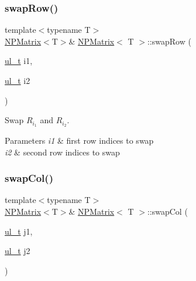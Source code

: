 \subsubsection{\texorpdfstring{swapRow()}{swapRow()}}
{\footnotesize\ttfamily template$<$typename T$>$ \\
\mbox{\hyperlink{class_n_p_matrix}{N\+P\+Matrix}}$<$T$>$\& \mbox{\hyperlink{class_n_p_matrix}{N\+P\+Matrix}}$<$ T $>$\+::swap\+Row (\begin{DoxyParamCaption}\item[{\mbox{\hyperlink{group___n_algebra_ga1b140a2034db3f5dfe18a987745df43a}{ul\+\_\+t}}}]{i1,  }\item[{\mbox{\hyperlink{group___n_algebra_ga1b140a2034db3f5dfe18a987745df43a}{ul\+\_\+t}}}]{i2 }\end{DoxyParamCaption})\hspace{0.3cm}{\ttfamily [inline]}}



Swap $ R_{i_1} $ and $ R_{i_2} $. 


\begin{DoxyParams}{Parameters}
{\em i1} & first row indices to swap \\
\hline
{\em i2} & second row indices to swap \\
\hline
\end{DoxyParams}
\mbox{\label{class_n_p_matrix_a0df10f5717511bc15429955244b83ea1}} 
\subsubsection{\texorpdfstring{swapCol()}{swapCol()}}
{\footnotesize\ttfamily template$<$typename T$>$ \\
\mbox{\hyperlink{class_n_p_matrix}{N\+P\+Matrix}}$<$T$>$\& \mbox{\hyperlink{class_n_p_matrix}{N\+P\+Matrix}}$<$ T $>$\+::swap\+Col (\begin{DoxyParamCaption}\item[{\mbox{\hyperlink{group___n_algebra_ga1b140a2034db3f5dfe18a987745df43a}{ul\+\_\+t}}}]{j1,  }\item[{\mbox{\hyperlink{group___n_algebra_ga1b140a2034db3f5dfe18a987745df43a}{ul\+\_\+t}}}]{j2 }\end{DoxyParamCaption})\hspace{0.3cm}{\ttfamily [inline]}}



